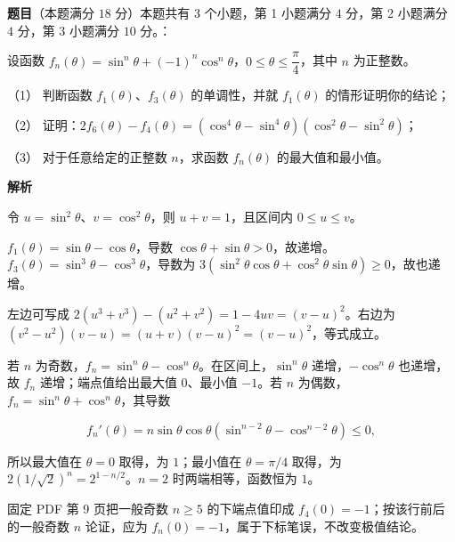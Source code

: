 \begin{answer}

\textbf{题目}（本题满分 $18$ 分）本题共有 $3$ 个小题，第 1 小题满分 $4$ 分，第 2 小题满分 $4$ 分，第 3 小题满分 $10$ 分。：

设函数 $f_n(\theta)=\sin^n\theta+(-1)^n\cos^n\theta$，$0\le\theta\le\dfrac{\pi}{4}$，其中 $n$ 为正整数。

（1） 判断函数 $f_1(\theta)$、$f_3(\theta)$ 的单调性，并就 $f_1(\theta)$ 的情形证明你的结论；

（2） 证明：$2f_6(\theta)-f_4(\theta)=(\cos^4\theta-\sin^4\theta)(\cos^2\theta-\sin^2\theta)$；

（3） 对于任意给定的正整数 $n$，求函数 $f_n(\theta)$ 的最大值和最小值。

\textbf{解析}

令 $u=\sin^2\theta$、$v=\cos^2\theta$，则 $u+v=1$，且区间内 $0\le u\le v$。


$f_1(\theta)=\sin\theta-\cos\theta$，导数 $\cos\theta+\sin\theta>0$，故递增。$f_3(\theta)=\sin^3\theta-\cos^3\theta$，导数为 $3(\sin^2\theta\cos\theta+\cos^2\theta\sin\theta)\ge0$，故也递增。


左边可写成 $2(u^3+v^3)-(u^2+v^2)=1-4uv=(v-u)^2$。右边为 $(v^2-u^2)(v-u)=(u+v)(v-u)^2=(v-u)^2$，等式成立。


若 $n$ 为奇数，$f_n=\sin^n\theta-\cos^n\theta$。在区间上，$\sin^n\theta$ 递增，$-\cos^n\theta$ 也递增，故 $f_n$ 递增；端点值给出最大值 $0$、最小值 $-1$。若 $n$ 为偶数，$f_n=\sin^n\theta+\cos^n\theta$，其导数

\nopagebreak[4]
\[
f_n'(\theta)=n\sin\theta\cos\theta\left(\sin^{n-2}\theta-\cos^{n-2}\theta\right)\le0,
\]

所以最大值在 $\theta=0$ 取得，为 $1$；最小值在 $\theta=\pi/4$ 取得，为 $2(1/\sqrt2)^n=2^{1-n/2}$。$n=2$ 时两端相等，函数恒为 $1$。

固定 PDF 第 9 页把一般奇数 $n\ge5$ 的下端点值印成 $f_4(0)=-1$；按该行前后的一般奇数 $n$ 论证，应为 $f_n(0)=-1$，属于下标笔误，不改变极值结论。




\end{answer}